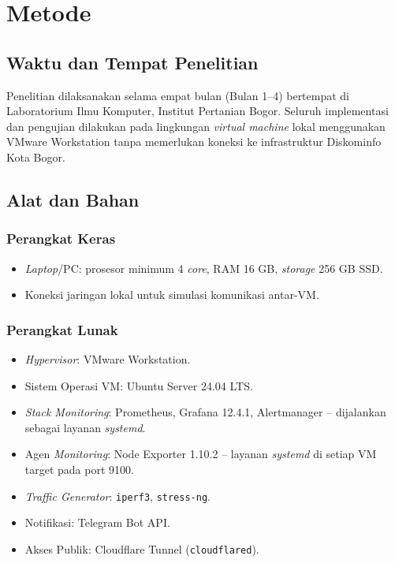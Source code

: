 \documentclass[10pt,twocolumn]{article}
\begin{document}
\section{Metode}

\subsection{Waktu dan Tempat Penelitian}

Penelitian dilaksanakan selama empat bulan (Bulan 1--4) bertempat di Laboratorium Ilmu Komputer,
Institut Pertanian Bogor. Seluruh implementasi dan pengujian dilakukan pada lingkungan
\textit{virtual machine} lokal menggunakan VMware Workstation tanpa memerlukan koneksi ke
infrastruktur Diskominfo Kota Bogor.

\subsection{Alat dan Bahan}

\subsubsection{Perangkat Keras}
\begin{itemize}[leftmargin=*]
  \item \textit{Laptop}/PC: prosesor minimum 4 \textit{core}, RAM 16 GB, \textit{storage} 256 GB SSD.
  \item Koneksi jaringan lokal untuk simulasi komunikasi antar-VM.
\end{itemize}

\subsubsection{Perangkat Lunak}
\begin{itemize}[leftmargin=*]
  \item \textit{Hypervisor}: VMware Workstation.
  \item Sistem Operasi VM: Ubuntu Server 24.04 LTS.
  \item \textit{Stack Monitoring}: Prometheus, Grafana 12.4.1, Alertmanager -- dijalankan sebagai
        layanan \textit{systemd}.
  \item Agen \textit{Monitoring}: Node Exporter 1.10.2 -- layanan \textit{systemd} di setiap VM
        target pada port 9100.
  \item \textit{Traffic Generator}: \texttt{iperf3}, \texttt{stress-ng}.
  \item Notifikasi: Telegram Bot API.
  \item Akses Publik: Cloudflare Tunnel (\texttt{cloudflared}).
\end{itemize}
\end{document}
